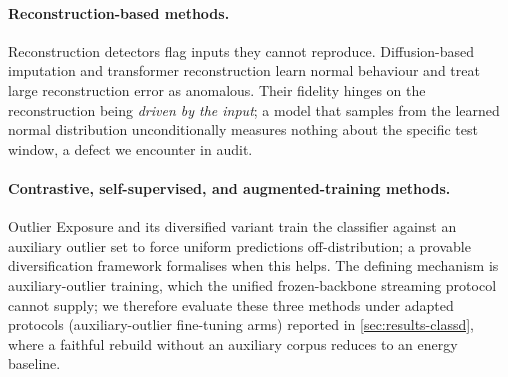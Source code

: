 \documentclass[11pt]{article}
\begin{document}
\paragraph{Reconstruction-based methods.}
Reconstruction detectors flag inputs they cannot reproduce. Diffusion-based
imputation \citep{Xiao2023} and transformer reconstruction \citep{Tuli2022} learn
normal behaviour and treat large reconstruction error as anomalous. Their fidelity
hinges on the reconstruction being \emph{driven by the input}; a model that samples
from the learned normal distribution unconditionally measures nothing about the
specific test window, a defect we encounter in audit.

\paragraph{Contrastive, self-supervised, and augmented-training methods.}
Outlier Exposure \citep{Hendrycks2019} and its diversified variant \citep{Zhu2023}
train the classifier against an auxiliary outlier set to force uniform predictions
off-distribution; a provable diversification framework \citep{Diversification2024}
formalises when this helps. The defining mechanism is auxiliary-outlier training,
which the unified frozen-backbone streaming protocol cannot supply; we therefore
evaluate these three methods under adapted protocols (auxiliary-outlier fine-tuning
arms) reported in \cref{sec:results-classd}, where a faithful rebuild without an
auxiliary corpus reduces to an energy baseline.
\end{document}
